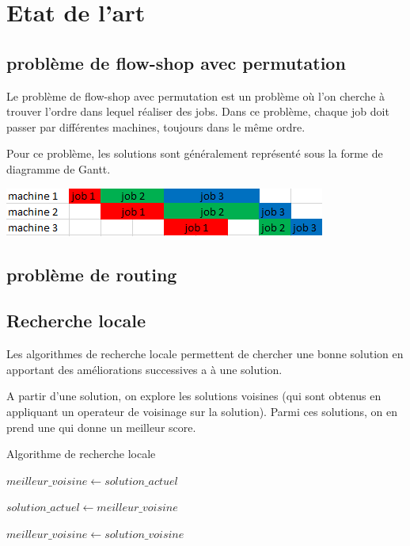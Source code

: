 \chapter{Etat de l'art}

\section{problème de flow-shop avec permutation}
Le problème de flow-shop avec permutation est un problème où l'on cherche à trouver l'ordre dans lequel réaliser des jobs.
Dans ce problème, chaque job doit passer par différentes machines, toujours dans le même ordre.

Pour ce problème, les solutions sont généralement représenté sous la forme de diagramme de Gantt.

\includegraphics{parts/etat_de_l_art/gantt_exemple.png}

\section{problème de routing}
\section{Recherche locale}
\label{section:recherche_locale}

Les algorithmes de recherche locale permettent de chercher une bonne solution en apportant des améliorations successives a à une solution.

A partir d'une solution, on explore les solutions voisines (qui sont obtenus en appliquant un operateur de voisinage sur la solution).
Parmi ces solutions, on en prend une qui donne un meilleur score.

\begin{algorithm}
	\caption{Algorithme de recherche locale} 
	\label{algo:recherche_locale}

	$meilleur\_voisine \gets solution\_actuel$

	{
		$solution\_actuel \gets meilleur\_voisine$

		{
			{
				$meilleur\_voisine \gets solution\_voisine$
			}
		}
	}
\end{algorithm}